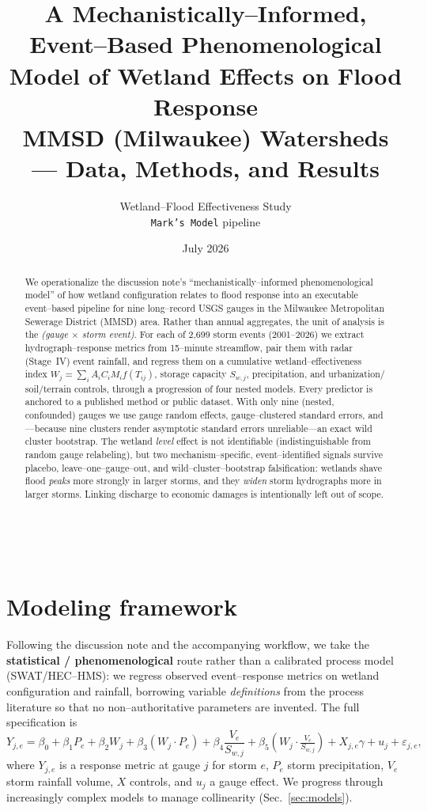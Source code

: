 \documentclass[11pt]{article}
\title{\textbf{A Mechanistically--Informed, Event--Based Phenomenological Model
of Wetland Effects on Flood Response} \\[4pt]
\large MMSD (Milwaukee) Watersheds --- Data, Methods, and Results}
\author{Wetland--Flood Effectiveness Study \\ \texttt{Mark's Model} pipeline}
\date{July 2026}
\newcommand{\Wj}{W_{j}}
\newcommand{\Swj}{S_{w,j}}
\begin{document}
 
\maketitle

\begin{abstract}
\noindent
We operationalize the discussion note's ``mechanistically--informed phenomenological
model'' of how wetland configuration relates to flood response into an executable
event--based pipeline for nine long--record USGS gauges in the Milwaukee Metropolitan
Sewerage District (MMSD) area. Rather than annual aggregates, the unit of analysis is the
\emph{(gauge $\times$ storm event)}. For each of 2{,}699 storm events (2001--2026) we
extract hydrograph--response metrics from 15--minute streamflow, pair them with radar
(Stage~IV) event rainfall, and regress them on a cumulative wetland--effectiveness index
$\Wj=\sum_i A_i C_i M_i f(T_{ij})$, storage capacity $\Swj$, precipitation, and urbanization/
soil/terrain controls, through a progression of four nested models. Every predictor is
anchored to a published method or public dataset. With only nine (nested, confounded) gauges
we use gauge random effects, gauge--clustered standard errors, and---because nine clusters
render asymptotic standard errors unreliable---an exact wild cluster bootstrap. The wetland
\emph{level} effect is not identifiable (indistinguishable from random gauge relabeling), but
two mechanism--specific, event--identified signals survive placebo, leave--one--gauge--out,
and wild--cluster--bootstrap falsification: wetlands shave flood \emph{peaks} more strongly in
larger storms, and they \emph{widen} storm hydrographs more in larger storms. Linking discharge
to economic damages is intentionally left out of scope.
\end{abstract}

\section{Modeling framework}
Following the discussion note and the accompanying workflow, we take the
\textbf{statistical / phenomenological} route rather than a calibrated process model
(SWAT/HEC--HMS): we regress observed event--response metrics on wetland configuration and
rainfall, borrowing variable \emph{definitions} from the process literature so that no
non--authoritative parameters are invented. The full specification is
\begin{equation}
Y_{j,e} = \beta_0 + \beta_1 P_e + \beta_2 \Wj + \beta_3 (\Wj\!\cdot\!P_e)
   + \beta_4 \frac{V_e}{\Swj} + \beta_5\!\left(\Wj\!\cdot\!\tfrac{V_e}{\Swj}\right)
   + X_{j,e}\gamma + u_j + \varepsilon_{j,e},
\label{eq:full}
\end{equation}
where $Y_{j,e}$ is a response metric at gauge $j$ for storm $e$, $P_e$ storm precipitation,
$V_e$ storm rainfall volume, $X$ controls, and $u_j$ a gauge effect. We progress through
increasingly complex models to manage collinearity (Sec.~\ref{sec:models}).
\end{document}
